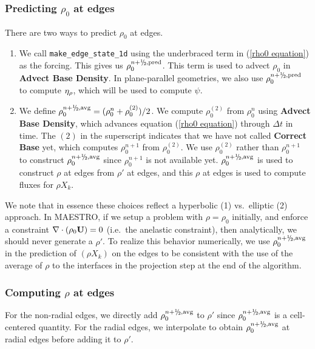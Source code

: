 \subsubsection{Predicting $\rho_0$ at edges}\label{Predicting rho0 at edges}
There are two ways to predict $\rho_0$ at edges.
\begin{enumerate}

\item We call {\tt make\_edge\_state\_1d} using the underbraced term
in (\ref{rho0 equation}) as the forcing.  This gives us
$\rho_0^{n+\myhalf,{\rm pred}}$.  This term is used to advect $\rho_0$
in {\bf Advect Base Density}.  In plane-parallel geometries, we also use
$\rho_0^{n+\myhalf,{\rm pred}}$ to compute $\eta_{\rho}$, which will be used 
to compute $\psi$.

\item We define $\rho_0^{n+\myhalf,{\rm avg}} = (\rho_0^n +
\rho_0^{(2)})/2$.  We compute $\rho_0^{(2)}$ from $\rho_0^n$ using
{\bf Advect Base Density}, which advances equation (\ref{rho0 equation})
through $\Delta t$ in time.  The $(2)$ in the superscript indicates
that we have not called {\bf Correct Base} yet, which computes
$\rho_0^{n+1}$ from $\rho_0^{(2)}$.  We use $\rho_0^{(2)}$ rather than
$\rho_0^{n+1}$ to construct $\rho_0^{n+\myhalf,{\rm avg}}$ since $\rho_0^{n+1}$
is not available yet.  $\rho_0^{n+\myhalf,{\rm avg}}$ is used to construct 
$\rho$ at edges from $\rho'$ at edges, and
this $\rho$ at edges is used to compute fluxes for $\rho X_k$.
\end{enumerate}

We note that in essence these choices reflect a hyperbolic (1)
vs.\ elliptic (2) approach.  In MAESTRO, if we setup a problem with
$\rho = \rho_0$ initially, and enforce a constraint $\nabla \cdot
(\rho_0 {\bf U}) = 0$ (i.e.\ the anelastic constraint), then analytically,
we should never generate a $\rho'$.  To realize this behavior
numerically, we use $\rho_0^{n+\myhalf,{\rm avg}}$ in the prediction
of $(\rho X_k)$ on the edges to be consistent with the use of the
average of $\rho$ to the interfaces in the projection step at the end
of the algorithm.

\subsubsection{Computing $\rho$ at edges}\label{Computing rho at edges}
For the non-radial edges, we directly add $\rho_0^{n+\myhalf,{\rm avg}}$
to $\rho'$ since $\rho_0^{n+\myhalf,{\rm avg}}$ is a cell-centered
quantity.  For the radial edges, we interpolate to obtain
$\rho_0^{n+\myhalf,{\rm avg}}$ at radial edges before adding it to
$\rho'$.

